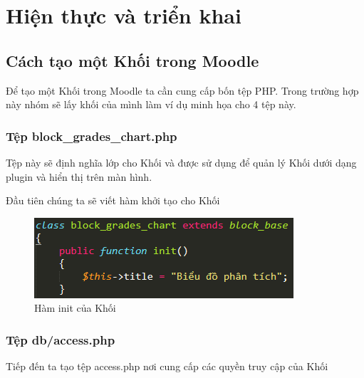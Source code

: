 \setcounter{chapter}{3}
\chapter{Hiện thực và triển khai}

\section{Cách tạo một Khối trong Moodle \cite{createblock}}

Để tạo một Khối trong Moodle ta cần cung cấp bốn tệp PHP. Trong trường hợp này nhóm sẽ lấy khối của mình làm ví dụ minh họa cho 4 tệp này.

\subsection{Tệp block\_grades\_chart.php}

Tệp này sẽ định nghĩa lớp cho Khối và được sử dụng để quản lý Khối dưới dạng plugin và hiển thị trên màn hình.

Đầu tiên chúng ta sẽ viết hàm khởi tạo cho Khối

\begin{center}
	\begin{figure}[htp]
		\begin{center}
			\includegraphics[scale=1]{img/initblock}
		\end{center}
		\caption{Hàm init của Khối}
		\label{refhinh22}
	\end{figure}
\end{center}

\newpage
\subsection{Tệp db/access.php}

Tiếp đến ta tạo tệp access.php nơi cung cấp các quyền truy cập của Khối

